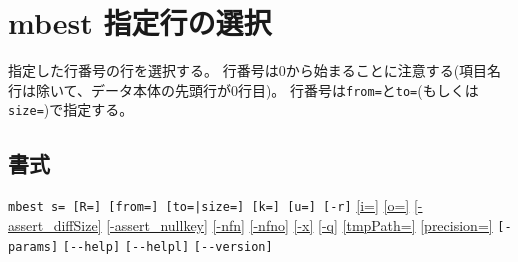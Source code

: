 
%

\section{mbest 指定行の選択\label{sect:mbest}}
指定した行番号の行を選択する。
行番号は0から始まることに注意する(項目名行は除いて、データ本体の先頭行が0行目)。
行番号は\verb|from=|と\verb|to=|(もしくは\verb|size=|)で指定する。

\subsection*{書式}
\verb/mbest s= [R=] [from=] [to=|size=] [k=] [u=] [-r]/
\hyperref[sect:option_i]{[i=]}
\hyperref[sect:option_o]{[o=]}
\hyperref[sect:option_assert_diffSize]{[-assert\_diffSize]}
\hyperref[sect:option_assert_nullkey]{[-assert\_nullkey]}
\hyperref[sect:option_nfn]{[-nfn]} 
\hyperref[sect:option_nfno]{[-nfno]}  
\hyperref[sect:option_x]{[-x]}
\hyperref[sect:option_q]{[-q]}
\hyperref[sect:option_option_tmppath]{[tmpPath=]}
\hyperref[sect:option_precision]{[precision=]}
\verb|[-params]|
\verb|[--help]|
\verb|[--helpl]|
\verb|[--version]|\\

